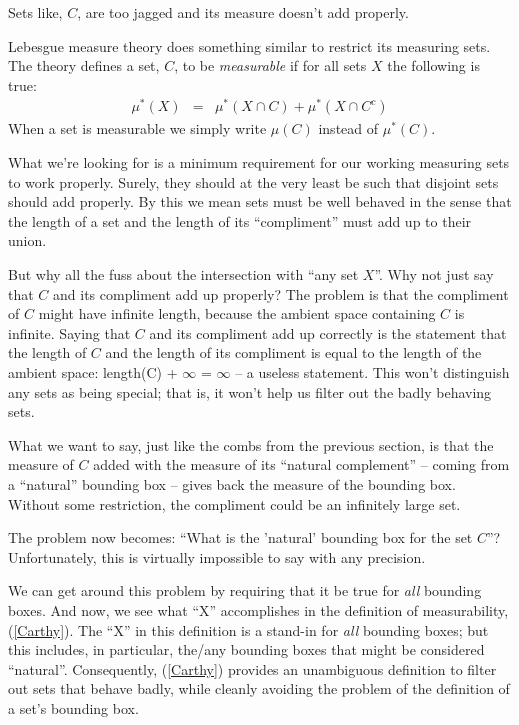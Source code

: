 \documentclass{article}
\begin{document}
Sets like, $C$, are too jagged and its measure doesn't add properly.

Lebesgue measure theory does something similar to restrict its measuring sets.
The theory defines a set, $C$, to be {\em measurable\/}
if for all sets $X$ the following is true:
\begin{eqnarray}
	\mu^*(X) & = & \mu^*(X \cap C) + \mu^*(X \cap C^c) \label{Carthy}
\end{eqnarray}
When a set is measurable we simply write $\mu(C)$ instead of $\mu^*(C)$.

What we're looking for is a minimum requirement for our working measuring sets 
to work properly. Surely, they should at the very least be such that disjoint sets
should add properly. 
By this we mean sets must be well behaved
in the sense that the length of a set and the length of its ``compliment'' 
must add up to their union. 

But why all the fuss about the intersection with ``any set $X$''.
Why not just say that $C$ and its compliment add up properly?
The problem is that the compliment of $C$ might have infinite length, because
the ambient space containing $C$ is infinite.
Saying that $C$ and its compliment add up correctly is the statement that 
the length of $C$ and the length of its compliment is equal to the length 
of the ambient space: length(C) + $\infty$ = $\infty$ -- a useless statement.
This won't distinguish any sets as being special; that is, it won't help
us filter out the badly behaving sets.

What we want to say, just like the combs from the
previous section, is that the measure of $C$ added with the measure of its 
``natural complement'' -- coming from a ``natural'' bounding box -- 
gives back the measure of the bounding box.
Without some restriction, the compliment could be 
an infinitely large set.

The problem now becomes: ``What is the 'natural' bounding box for the set $C$''?
Unfortunately, this is virtually impossible to say with any precision.

We can get around this problem by requiring that it be true for {\em all\/} 
bounding boxes. And now, we see what ``X'' accomplishes in the definition of 
measurability, (\ref{Carthy}). The ``X'' in this definition is a stand-in for 
{\em all\/} bounding boxes; but this includes, in particular, the/any 
bounding boxes that might be considered ``natural''. 
Consequently, (\ref{Carthy}) provides an unambiguous definition to filter out 
sets that behave badly, while cleanly avoiding 
the problem of the definition of a set's bounding box.
\end{document}
